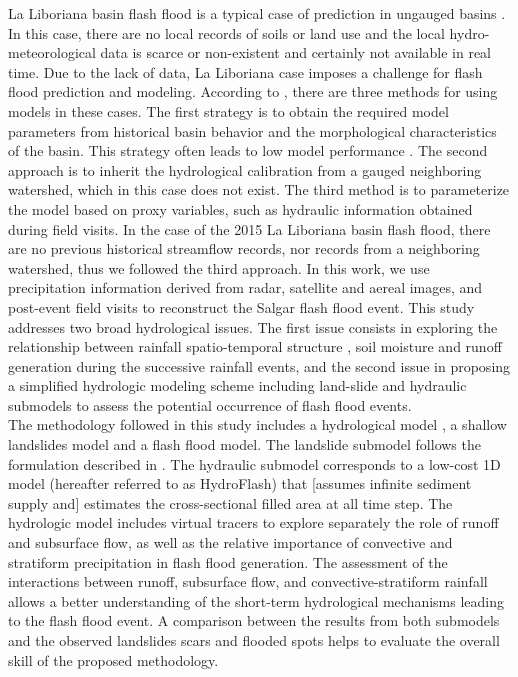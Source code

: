 \documentclass[hess, manuscript]{copernicus}
\begin{document}
La Liboriana basin flash flood is a typical case of prediction in ungauged basins  \citep{Sivapalan2013, Seibert2009, Beven2007, Bonell2006, Yamanaka2017}.  In this case,  there are no local records of soils or land use and the local hydro-meteorological data is scarce or non-existent and certainly not available in real time. Due to the lack of data, La Liboriana case imposes a challenge for flash flood prediction and modeling. According to \citet{blschl2012}, there are three methods for using models in these cases. The first strategy is to obtain the required model parameters from historical basin behavior and the morphological characteristics of the basin. This strategy often leads to low model performance \citep{Duan2006}. The second approach is to inherit the hydrological calibration from a gauged neighboring watershed, which in this case does not exist. The third method is to parameterize the model based on proxy variables, such as hydraulic information obtained during field visits. In the case of the 2015 La Liboriana basin flash flood, there are no previous historical streamflow records, nor records from a neighboring watershed, thus we followed the third approach. In this work, we use precipitation information derived from radar, satellite and aereal images, and post-event field visits to reconstruct the Salgar flash flood event. This study addresses two broad hydrological issues. The first issue consists in exploring the relationship between rainfall spatio-temporal structure \citep{Llasat2016,Fragoso2012}, soil moisture and runoff generation \citep{Penna2011,Tramblay2012b,Garambois2013} during the successive rainfall events, and the second issue in proposing a simplified hydrologic modeling scheme including land-slide and hydraulic submodels to assess the potential occurrence of flash flood events.\\

The methodology followed in this study includes a hydrological model \citep{Velez2001, Frances2007b}, a shallow landslides model and a flash flood model. The landslide submodel follows the formulation described in \citep{Aristizabal2016}. The hydraulic submodel corresponds to a low-cost 1D model (hereafter referred to as HydroFlash) that [assumes infinite sediment supply and] estimates the cross-sectional filled area at all time step. The hydrologic model includes virtual tracers to explore separately the role of runoff and subsurface flow, as well as the relative importance of convective and stratiform precipitation in flash flood generation. The assessment of the interactions between runoff, subsurface flow, and convective-stratiform rainfall allows a better understanding of the short-term hydrological mechanisms leading to the flash flood event.  A comparison between the results from both submodels and the observed landslides scars and flooded spots helps to evaluate the overall skill of the proposed methodology. \\
\end{document}
